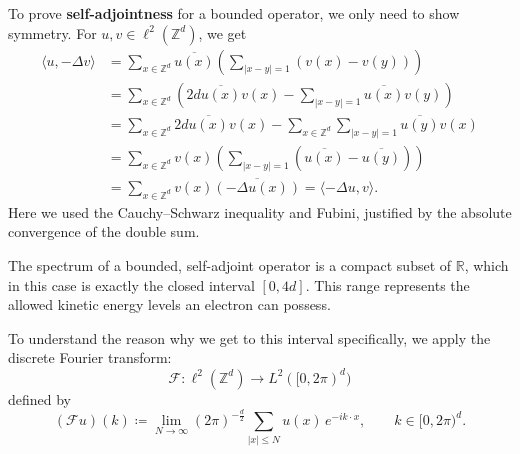 \documentclass[11pt, a4paper, UKenglish, oneside]{book}
\theoremstyle{plain}
\theoremstyle{remark}
\theoremstyle{definition}
\numberwithin{equation}{section}
\numberwithin{theorem}{section}
\begin{document}
To prove \textbf{self-adjointness} for a bounded operator, we only need to show symmetry. For $u, v \in \ell^2(\mathbb{Z}^d)$, we get
\begin{align*}
\langle u, -\Delta v \rangle &= \sum_{x \in \mathbb{Z}^d} \overline{u(x)} \left( \sum_{|x - y| = 1} (v(x) - v(y)) \right) \\
&= \sum_{x \in \mathbb{Z}^d} \left( 2d \overline{u(x)} v(x) -  \sum_{|x - y| = 1} \overline{u(x)} v(y)\right)\\
&=\sum_{x \in \mathbb{Z}^d} 2d \overline{u(x)} v(x) - \sum_{x \in \mathbb{Z}^d} \sum_{|x - y| = 1} \overline{u(y)} v(x) \\
&= \sum_{x \in \mathbb{Z}^d} v(x) \left( \sum_{|x - y| = 1} (\overline{u(x)} - \overline{u(y)}) \right)\\
 &= \sum_{x \in \mathbb{Z}^d} v(x) \overline{(-\Delta u(x))} = \langle - \Delta u, v \rangle.
\end{align*}
Here we used the Cauchy--Schwarz inequality and Fubini, justified by the absolute convergence of the double sum.
\vspace{1em}

The spectrum of a bounded, self-adjoint operator is a compact subset of $\mathbb{R}$, which in this case is exactly the closed interval $[0,4d]$. This range represents the allowed kinetic energy levels an electron can possess. 

To understand the reason why we get to this interval specifically, we apply the discrete Fourier transform:
\[
\mathcal{F} \colon \ell^2(\mathbb{Z}^d) \longrightarrow L^2([0, 2\pi)^d)
\]
defined by
\[
(\mathcal{F}u)(k) \coloneqq \lim_{N \rightarrow \infty} (2\pi)^{-\frac{d}{2}} \sum_{|x| \leq N} u(x)\, e^{- i k \cdot x}, \qquad k \in [0, 2\pi)^d.
\]
\end{document}
